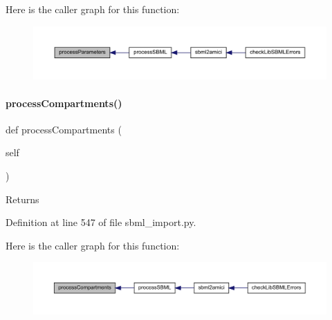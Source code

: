 Here is the caller graph for this function\+:
\nopagebreak
\begin{figure}[H]
\begin{center}
\leavevmode
\includegraphics[width=350pt]{classamici_1_1sbml__import_1_1_sbml_importer_a26d072114efe1fec695cc4030c64e1ea_icgraph}
\end{center}
\end{figure}
\mbox{\label{classamici_1_1sbml__import_1_1_sbml_importer_a526afc71a857e7fdefb4754fc2f93882}} 
\paragraph{\texorpdfstring{process\+Compartments()}{processCompartments()}}
{\footnotesize\ttfamily def process\+Compartments (\begin{DoxyParamCaption}\item[{}]{self }\end{DoxyParamCaption})}

\begin{DoxyReturn}{Returns}

\end{DoxyReturn}


Definition at line 547 of file sbml\+\_\+import.\+py.

Here is the caller graph for this function\+:
\nopagebreak
\begin{figure}[H]
\begin{center}
\leavevmode
\includegraphics[width=350pt]{classamici_1_1sbml__import_1_1_sbml_importer_a526afc71a857e7fdefb4754fc2f93882_icgraph}
\end{center}
\end{figure}
\mbox{\label{classamici_1_1sbml__import_1_1_sbml_importer_adbdd8e9af99679633109829d94b3fd3e}} 

